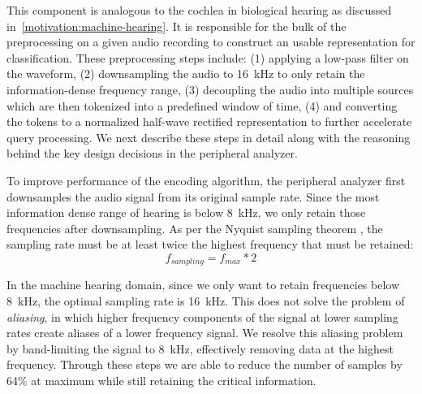 This component is analogous to the cochlea in biological hearing as discussed
in~\autoref{motivation:machine-hearing}.
%
It is responsible for the bulk of the preprocessing on a given audio recording
to construct an usable representation for classification.
%
These preprocessing steps include: 
(1) applying a low-pass filter on the waveform, 
%
(2) downsampling the audio to 16~kHz to only retain the information-dense
frequency range, 
%
(3) decoupling the audio into multiple sources which are then tokenized into a
predefined window of time, 
%
(4) and converting the tokens to a normalized half-wave rectified 
representation to further accelerate query processing.
%
We next describe these steps in detail along with the reasoning behind the 
key design decisions in the peripheral analyzer.

%
To improve performance of the encoding algorithm, the peripheral analyzer first 
downsamples the audio signal from its original sample rate.
%
Since the most information dense range of hearing is below 8~kHz,
we only retain those frequencies after downsampling.
%
As per the Nyquist sampling theorem \cite{weik_nyquist_2001}, the sampling rate must be at
least twice the highest frequency that must be retained:
\begin{equation} \label{eq:nyq}
    f_{sampling} = f_{max} * 2
\end{equation}

In the machine hearing domain, since we only want to retain frequencies below
8~kHz, the optimal sampling rate is 16~kHz. 
%
This does not solve the problem of \textit{aliasing}, 
in which higher frequency components of the signal at lower sampling rates
create aliases of a lower frequency signal.
%
We resolve this aliasing problem by band-limiting the signal to 8~kHz,
effectively removing data at the highest frequency. 
%
Through these steps we are able to reduce the number of samples by 
64\% at maximum while still retaining the critical information.

